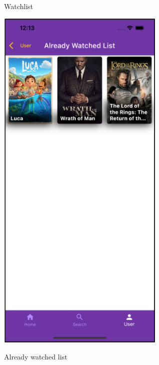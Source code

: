 \documentclass[12pt, a4paper]{article}
\numberwithin{figure}{section}
\begin{document}
\begin{center}
\begin{minipage}[t]{0.31\textwidth}
\begin{figure}[H]
			\caption{Watchlist}
		\end{figure}
	\end{minipage}
	\hspace{0.015\linewidth}
	\begin{minipage}[t]{0.31\textwidth}
		\begin{figure}[H]
			\centering
			\includegraphics[width=0.71\textwidth]{images/final/watched.png}\\
			\caption{Already watched list}
		\end{figure}
	\end{minipage}
	\hspace{0.015\linewidth}
	\begin{minipage}[t]{0.31\textwidth}
		\begin{figure}[H]

\end{figure}
\end{minipage}
\end{center}
\end{document}
